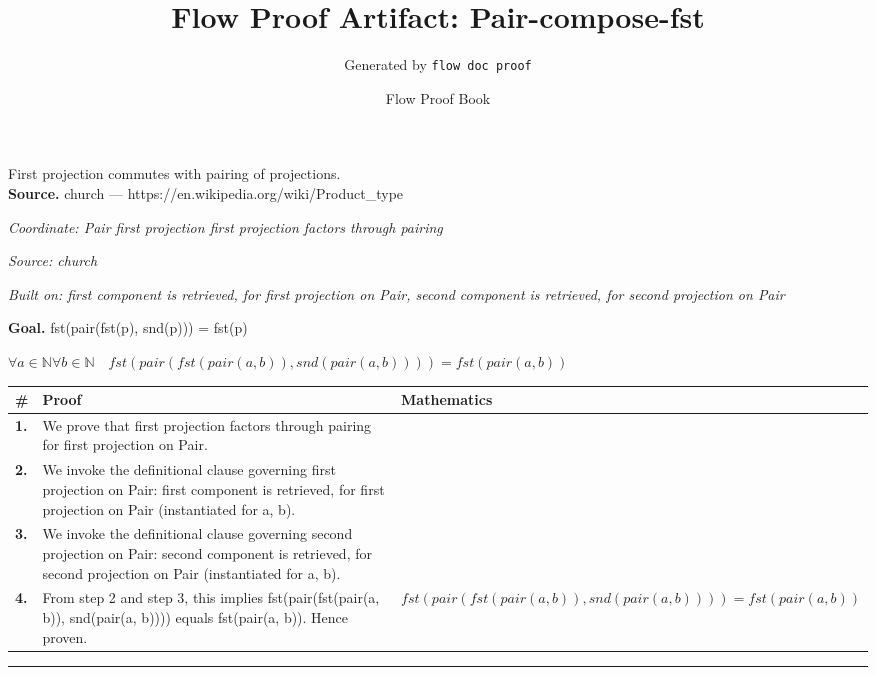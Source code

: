\documentclass[11pt]{article}
\title{Flow Proof Artifact: Pair-compose-fst}
\author{Generated by \texttt{flow doc proof}}
\date{Flow Proof Book}
\theoremstyle{definition}
\begin{document}
\maketitle
First projection commutes with pairing of projections.\\[0.5em]
\textbf{Source.} church — https://en.wikipedia.org/wiki/Product\_type\\[0.5em]
\bigskip
{}\par
\smallskip\noindent\textit{Coordinate: Pair \cdot first projection \cdot first projection factors through pairing}\par
\smallskip\noindent\textit{Source: church}\par
\smallskip\noindent\textit{Built on: first component is retrieved, for first projection on Pair, second component is retrieved, for second projection on Pair}\par
\medskip
\noindent\textbf{Goal.} fst(pair(fst(p), snd(p))) = fst(p)\par
\noindent$\displaystyle \forall a \in \mathbb{N} \forall b \in \mathbb{N}\quad fst(pair(fst(pair(a, b)), snd(pair(a, b)))) = fst(pair(a, b))$\par
\medskip
\noindent
\begin{tabular}{@{} >{\raggedright\arraybackslash}p{} >{\raggedright\arraybackslash}p{} >{\raggedleft\arraybackslash}p{} @{}}
\textbf{\#} & \textbf{Proof} & \textbf{Mathematics} \\
\midrule
\textbf{1.} & We prove that first projection factors through pairing for first projection on Pair. & \\[0.45em]
\textbf{2.} & We invoke the definitional clause governing first projection on Pair: first component is retrieved, for first projection on Pair (instantiated for a, b). & \\[0.45em]
\textbf{3.} & We invoke the definitional clause governing second projection on Pair: second component is retrieved, for second projection on Pair (instantiated for a, b). & \\[0.45em]
\textbf{4.} & From step 2 and step 3, this implies fst(pair(fst(pair(a, b)), snd(pair(a, b)))) equals fst(pair(a, b)). Hence proven. & $\displaystyle fst(pair(fst(pair(a, b)), snd(pair(a, b)))) = fst(pair(a, b))$ \\[0.45em]
\bottomrule
\end{tabular}
\label{thm:Pair-first projection-first_projection_factors_through_pairing}
\par\medskip\hrule
\end{document}
